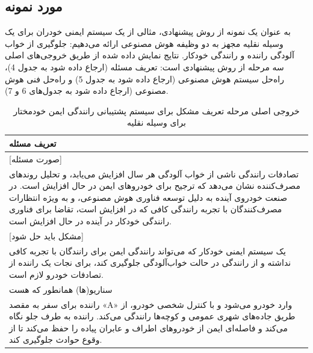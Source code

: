 \documentclass[a4paper,10pt]{article}
\begin{document}
        \subsection{مورد نمونه}

            به عنوان یک نمونه از روش پیشنهادی، مثالی از یک سیستم ایمنی خودران برای یک وسیله نقلیه مجهز به دو وظیفه هوش مصنوعی ارائه می‌دهیم: جلوگیری از خواب آلودگی راننده و رانندگی خودکار. نتایج نمایش داده شده از طریق خروجی‌های اصلی سه مرحله از روش پیشنهادی است: تعریف مسئله (ارجاع داده شود به جدول 4)، راه‌حل سیستم هوش مصنوعی (ارجاع داده شود به جدول 5) و راه‌حل فنی هوش مصنوعی (ارجاع داده شود به جدول‌های 6 و 7).

            \begin{table}[htbp]

                \centering
                \caption{خروجی اصلی مرحله تعریف مشکل برای سیستم پشتیبانی رانندگی ایمن خودمختار برای وسیله نقلیه}
                \begin{tabularx}{\textwidth}{X}

                    \hline

                    تعریف مسئله \\

                    \hline

                    [صورت مسئله] \\

                    تصادفات رانندگی ناشی از خواب آلودگی هر سال افزایش می‌یابد، و تحلیل روندهای مصرف‌کننده نشان می‌دهد که ترجیح برای خودروهای ایمن در حال افزایش است. در صنعت خودروی آینده به دلیل توسعه فناوری هوش مصنوعی، و به ویژه انتظارات مصرف‌کنندگان با تجربه رانندگی کافی که در افزایش است، تقاضا برای فناوری رانندگی خودکار در آینده در حال افزایش است. \\

                    [مشکل باید حل شود] \\

                    یک سیستم ایمنی خودکار که می‌تواند رانندگی ایمن برای رانندگان با تجربه کافی نداشته و از رانندگی در حالت خواب‌آلودگی جلوگیری کند، برای نجات یک راننده از تصادفات خودرو لازم است. \\

                    \hline

                    سناریو(ها) همانطور که هست \\

                    \hline

                    راننده برای سفر به مقصد «A» وارد خودرو می‌شود و با کنترل شخصی خودرو، از طریق جاده‌های شهری عمومی و کوچه‌ها رانندگی می‌کند. راننده به طرف جلو نگاه می‌کند و فاصله‌ای ایمن از خودروهای اطراف و عابران پیاده را حفظ می‌کند تا از وقوع حوادث جلوگیری کند. \\  


\end{tabularx}
\end{table}
\end{document}
